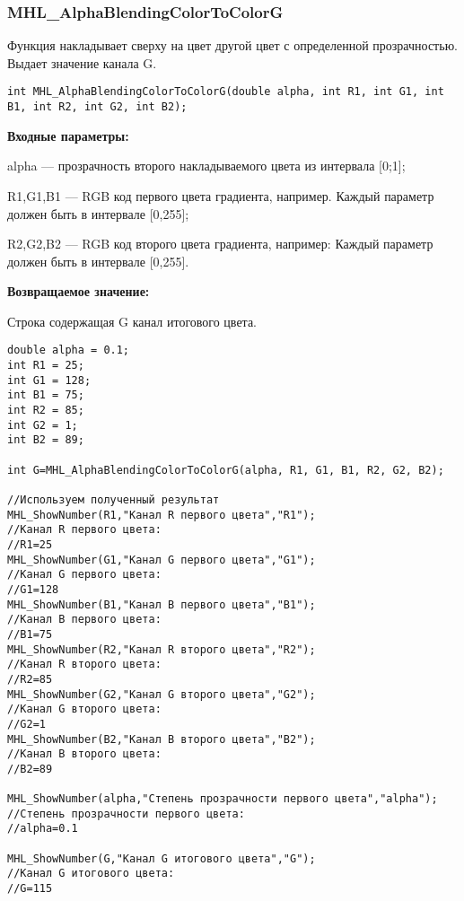 \documentclass[a4paper,12pt]{article}
\begin{document}
\subsubsection{MHL\_AlphaBlendingColorToColorG}\label{MHL_AlphaBlendingColorToColorG}

Функция накладывает сверху на цвет другой цвет с определенной прозрачностью. Выдает значение канала G.


\begin{lstlisting}[label=code_syntax_MHL_AlphaBlendingColorToColorG,caption=Синтаксис]
int MHL_AlphaBlendingColorToColorG(double alpha, int R1, int G1, int B1, int R2, int G2, int B2);
\end{lstlisting}

\textbf{Входные параметры:}  

alpha --- прозрачность второго накладываемого цвета из интервала [0;1];
 
    R1,G1,B1 --- RGB код первого цвета градиента, например. Каждый параметр должен быть в интервале [0,255];
 
    R2,G2,B2 --- RGB код второго цвета градиента, например: Каждый параметр должен быть в интервале [0,255].

\textbf{Возвращаемое значение:}

Строка содержащая G канал итогового цвета.


\begin{lstlisting}[label=code_use_MHL_AlphaBlendingColorToColorG,caption=Пример использования]
double alpha = 0.1;
int R1 = 25;
int G1 = 128;
int B1 = 75;
int R2 = 85;
int G2 = 1;
int B2 = 89;

int G=MHL_AlphaBlendingColorToColorG(alpha, R1, G1, B1, R2, G2, B2);

//Используем полученный результат
MHL_ShowNumber(R1,"Канал R первого цвета","R1");
//Канал R первого цвета:
//R1=25
MHL_ShowNumber(G1,"Канал G первого цвета","G1");
//Канал G первого цвета:
//G1=128
MHL_ShowNumber(B1,"Канал B первого цвета","B1");
//Канал B первого цвета:
//B1=75
MHL_ShowNumber(R2,"Канал R второго цвета","R2");
//Канал R второго цвета:
//R2=85
MHL_ShowNumber(G2,"Канал G второго цвета","G2");
//Канал G второго цвета:
//G2=1
MHL_ShowNumber(B2,"Канал B второго цвета","B2");
//Канал B второго цвета:
//B2=89

MHL_ShowNumber(alpha,"Степень прозрачности первого цвета","alpha");
//Степень прозрачности первого цвета:
//alpha=0.1

MHL_ShowNumber(G,"Канал G итогового цвета","G");
//Канал G итогового цвета:
//G=115
\end{lstlisting}
\end{document}
